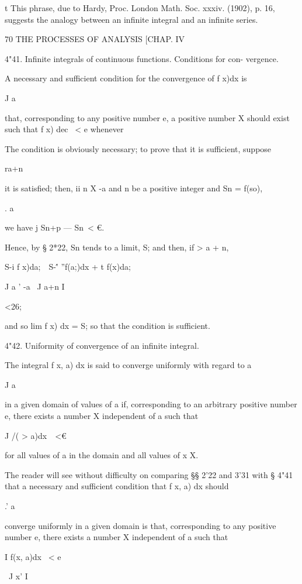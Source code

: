 t This phrase, due to Hardy, Proc. London Math. Soc. xxxiv. (1902), p.
16, suggests the analogy between an infinite integral and an infinite
series.



70 THE PROCESSES OF ANALYSIS [CHAP. IV

4"41. Infinite integrals of continuous functions. Conditions for con-
vergence.

A necessary and sufficient condition for the convergence of f x)dx is

J a

that, corresponding to any positive number e, a positive number X
should exist such that f x) dec \ < e whenever

The condition is obviously necessary; to prove that it is sufficient,
suppose

ra+n

it is satisfied; then, ii n X -a and n be a positive integer and Sn =
f(so),

. a

we have j Sn+p — Sn\ < €.

Hence, by § 2*22, Sn tends to a limit, S; and then, if > a + n,

S-i f x)da;\ \ S-\'' ''f(a;)dx + t f(x)da;\

J a ' -a \ J a+n I

<26;

and so lim f x) dx = S; so that the condition is sufficient.

4"42. Uniformity of convergence of an infinite integral.

The integral f x, a) dx is said to converge uniformly with regard to a

J a

in a given domain of values of a if, corresponding to an arbitrary
positive number e, there exists a number X independent of a such that

J /( > a)dx\ \ <€

for all values of a in the domain and all values of x X.

The reader will see without difficulty on comparing §§ 2'22 and 3'31
with § 4"41 that a necessary and sufficient condition that f x, a) dx
should

.' a

converge uniformly in a given domain is that, corresponding to any
positive number e, there exists a number X independent of a such that

I f(x, a)dx \ < e

\ J x' I

